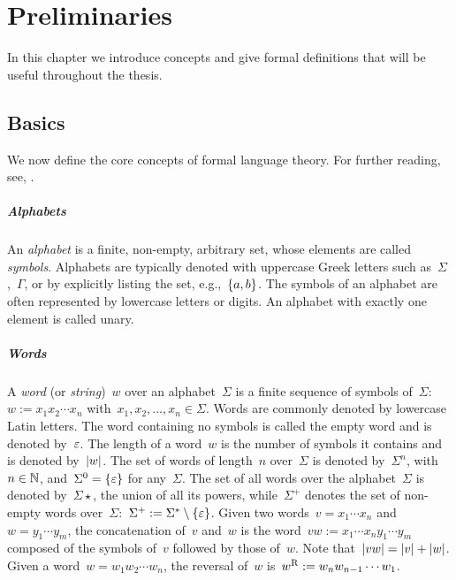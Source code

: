 \chapter{Preliminaries}\label{ch:preliminaries}
In this chapter we introduce concepts and give formal definitions that will be useful throughout the thesis.



\section{Basics}
We now define the core concepts of formal language theory.
For further reading, see, \eg[,] \cite{HopUll79,Sha08}.

\paragraph{Alphabets} An \emph{alphabet} is a finite, non-empty, arbitrary set, whose elements are called \emph{symbols}.
Alphabets are typically denoted with uppercase Greek letters such as~$\Sigma$,~$\Gamma$, or by explicitly listing the set, e.g.,~$\{a,b\}$.
The symbols of an alphabet are often represented by lowercase letters or digits.
An alphabet with exactly one element is called unary.

\paragraph{Words} A \emph{word} (or \emph{string})~$w$ over an alphabet~$\Sigma$ is a finite sequence of symbols of~$\Sigma$:~$w:=x_1 x_2 \cdots x_n$ with~$x_1,x_2,\dots,x_n\in\Sigma$.
Words are commonly denoted by lowercase Latin letters.
The word containing no symbols is called the empty word and is denoted by~$\varepsilon$.
The length of a word~$w$ is the number of symbols it contains and is denoted by~$\lvert w \rvert$.
The set of words of length~$n$ over~$\Sigma$ is denoted by~$\Sigma^n$, with~$n\in\mathbb N$, and~$\Sigma^0=\{\varepsilon\}$ for any~$\Sigma$.
The set of all words over the alphabet~$\Sigma$ is denoted by~$\Sigma\star$, \ie the union of all its powers, while~$\Sigma^+$ denotes the set of non-empty words over~$\Sigma$:~$\Sigma^+ := \Sigma^*\setminus\{\varepsilon\}$.
Given two words~$v=x_1\cdots x_n$ and~$w=y_1\cdots y_m$, the concatenation of~$v$ and~$w$ is the word~$vw:=x_1\cdots x_n y_1\cdots y_m$ composed of the symbols of~$v$ followed by those of~$w$.
Note that~$\lvert vw \rvert=\lvert v \rvert+\lvert w \rvert$.
Given a word~$w=w_1 w_2\cdots w_n$, the reversal of~$w$ is~$w^{\mathrm R}:=w_n w_{n-1}\cdots w_1$.

